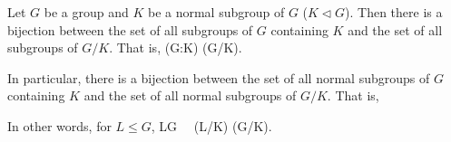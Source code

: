 


\begin{theorem}\label{thm:correspondence_subgroup_containg_normal_subgroup_quotient_group}%
Let $G$ be a group and $K$ be a normal subgroup of $G$ ($K\lhd G$). Then there is a bijection between the set of all subgroups of $G$ containing $K$ and the set of all subgroups of $G/K$. That is,
\be
\sub(G:K) \cong \sub(G/K).
\ee

In particular, there is a bijection between the set of all normal subgroups of $G$ containing $K$ and the set of all normal subgroups of $G/K$. That is,
\be
{}\ \longleftrightarrow \  
\ee

In other words, for $L\leq G$,
\be
L\lhd G \ \lra \ (L/K) \lhd (G/K).
\ee
\end{theorem}

